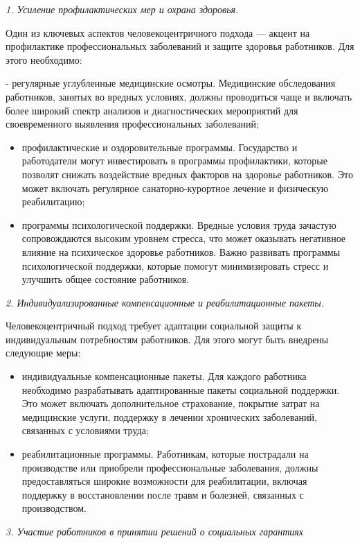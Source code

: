 \begin{multicols}{2}
\emph{1. Усиление профилактических мер и охрана здоровья.}

Один из ключевых аспектов человекоцентричного подхода --- акцент на
профилактике профессиональных заболеваний и защите здоровья работников.
Для этого необходимо:

- регулярные углубленные медицинские осмотры. Медицинские обследования
работников, занятых во вредных условиях, должны проводиться чаще и
включать более широкий спектр анализов и диагностических мероприятий для
своевременного выявления профессиональных заболеваний;

\begin{itemize}
\item
  профилактические и оздоровительные программы. Государство и
  работодатели могут инвестировать в программы профилактики, которые
  позволят снижать воздействие вредных факторов на здоровье работников.
  Это может включать регулярное санаторно-курортное лечение и физическую
  реабилитацию;
\item
  программы психологической поддержки. Вредные условия труда зачастую
  сопровождаются высоким уровнем стресса, что может оказывать негативное
  влияние на психическое здоровье работников. Важно развивать программы
  психологической поддержки, которые помогут минимизировать стресс и
  улучшить общее состояние работников.
\end{itemize}

\emph{2. Индивидуализированные компенсационные и реабилитационные
пакеты.}

Человекоцентричный подход требует адаптации социальной защиты к
индивидуальным потребностям работников. Для этого могут быть внедрены
следующие меры:

\begin{itemize}
\item
  индивидуальные компенсационные пакеты. Для каждого работника
  необходимо разрабатывать адаптированные пакеты социальной поддержки.
  Это может включать дополнительное страхование, покрытие затрат на
  медицинские услуги, поддержку в лечении хронических заболеваний,
  связанных с условиями труда;
\item
  реабилитационные программы. Работникам, которые пострадали на
  производстве или приобрели профессиональные заболевания, должны
  предоставляться широкие возможности для реабилитации, включая
  поддержку в восстановлении после травм и болезней, связанных с
  производством.
\end{itemize}

\emph{3. Участие работников в принятии решений о социальных гарантиях}


\end{multicols}
